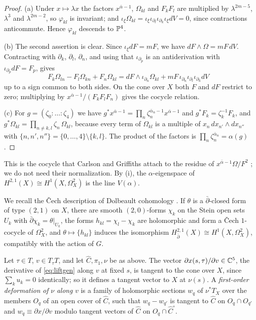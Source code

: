 \begin{proof}
(a) Under $x\mapsto\lambda x$ the factors $x^{\bar\alpha-1}$, $\Omega_{kl}$
and $F_{k}F_{l}$ are multiplied by $\lambda^{2m-5}$, $\lambda^{3}$ and
$\lambda^{2m-2}$, so $\varphi_{kl}$ is invariant; and $\iota_{\xi}
\Omega_{kl}=\iota_{\xi}\iota_{\partial_{l}}\iota_{\partial_{k}}\iota_{\xi}dV
=0$, since contractions anticommute. Hence $\varphi_{kl}$ descends to
$\mathbb{P}^{4}$.

(b) The second assertion is clear. Since $\iota_{\xi}dF=mF$, we have
$dF\wedge\Omega=mF\,dV$. Contracting with $\partial_{k}$, $\partial_{l}$,
$\partial_{n}$, and using that $\iota_{\partial_{p}}$ is an antiderivation
with $\iota_{\partial_{p}}dF=F_{p}$, gives
\[
  F_{k}\Omega_{ln}-F_{l}\Omega_{kn}+F_{n}\Omega_{kl}
  =dF\wedge\iota_{\partial_{n}}\Omega_{kl}+mF\,\iota_{\partial_{n}}
  \iota_{\partial_{l}}\iota_{\partial_{k}}dV
\]
up to a sign common to both sides. On the cone over $X$ both $F$ and $dF$
restrict to zero; multiplying by $x^{\bar\alpha-1}/(F_{k}F_{l}F_{n})$ gives
the cocycle relation.

(c) For $g=(\zeta_{0}:\dots:\zeta_{4})$ we have $g^{*}x^{\bar\alpha-1}=
\prod_{n}\zeta_{n}^{\bar\alpha_{n}-1}x^{\bar\alpha-1}$ and $g^{*}F_{k}=
\zeta_{k}^{-1}F_{k}$, and $g^{*}\Omega_{kl}=\prod_{n\ne k,l}\zeta_{n}\,
\Omega_{kl}$, because every term of $\Omega_{kl}$ is a multiple of
$x_{n}\,dx_{n'}\wedge dx_{n''}$ with $\{n,n',n''\}=\{0,\dots,4\}\setminus
\{k,l\}$. The product of the factors is $\prod_{n}\zeta_{n}^{\bar\alpha_{n}}
=\alpha(g)$.
\end{proof}

This is the cocycle that Carlson and Griffiths attach to the residue of
$x^{\bar\alpha-1}\Omega/F^{2}$ \cite[\S3(b)]{CG80}; we do not need their
normalization. By (i), the $\alpha$-eigenspace of
$H^{2,1}(X)\cong H^{1}(X,\Omega^{2}_{X})$ is the line $V(\alpha)$.

We recall the \v{C}ech description of Dolbeault cohomology
\cite[Chapter~4]{Voi02b}. If $\theta$ is a $\bar\partial$-closed form of type
$(2,1)$ on $X$, there are smooth $(2,0)$-forms $\chi_{k}$ on the Stein open
sets $U_{k}$ with $\bar\partial\chi_{k}=\theta|_{U_{k}}$, the forms
$h_{kl}=\chi_{l}-\chi_{k}$ are holomorphic and form a \v{C}ech $1$-cocycle of
$\Omega^{2}_{X}$, and $\theta\mapsto\{h_{kl}\}$ induces the isomorphism
$H^{2,1}_{\bar\partial}(X)\cong H^{1}(X,\Omega^{2}_{X})$, compatibly with
the action of $G$.

\begin{definition}\label{def:firstorder}
Let $\tau\in T$, $v\in T_{\tau}T$, and let $\widehat C,\pi_{1},\nu$ be as
above. The vector $\partial x(s,\tau)/\partial v\in\mathbb{C}^{5}$, the derivative
of \eqref{eq:liftgen} along $v$ at fixed $s$, is tangent to the cone over
$X$, since $\sum_{k}u_{k}=0$ identically; so it defines a tangent vector to
$X$ at $\nu(s)$. A \emph{first-order deformation of $\nu$ along $v$} is a
family of holomorphic sections $w_{q}$ of $\nu^{*}T_{X}$ over the members
$O_{q}$ of an open cover of $\widehat C$, such that $w_{q}-w_{q'}$ is
tangent to $\widehat C$ on $O_{q}\cap O_{q'}$ and $w_{q}\equiv\partial
x/\partial v$ modulo tangent vectors of $\widehat C$ on $O_{q}\cap
\widehat C^{\circ}$.
\end{definition}

